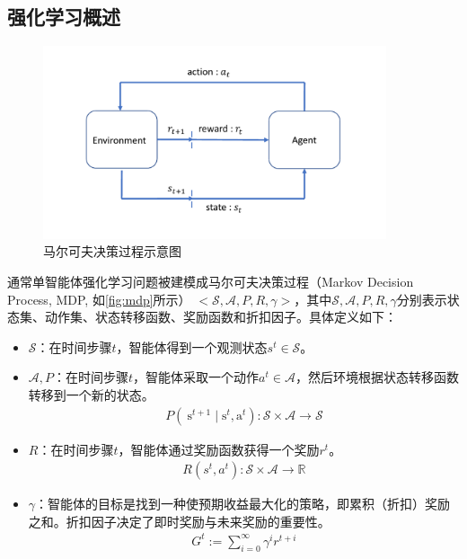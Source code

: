 \subsection{强化学习概述}
\begin{figure}[htb]
    \includegraphics[width=0.9\textwidth]{fig/rl.pdf}
    \caption{马尔可夫决策过程示意图}
    \label{fig:mdp}
\end{figure}
通常单智能体强化学习问题被建模成马尔可夫决策过程（Markov Decision Process, MDP, 如\autoref{fig:mdp}所示） $<\mathcal{S}, \mathcal{A}, P, R, \gamma>$，其中$\mathcal{S}, \mathcal{A}, P, R, \gamma$分别表示状态集、动作集、状态转移函数、奖励函数和折扣因子。具体定义如下：
\begin{itemize}
    \item $\mathcal{S}$：在时间步骤$t$，智能体得到一个观测状态$s^t \in \mathcal{S}$。
    \item $\mathcal{A}, P$：在时间步骤$t$，智能体采取一个动作$a^t \in \mathcal{A}$，然后环境根据状态转移函数转移到一个新的状态。
    \begin{align}
        P\left(\mathrm{~s}^{t+1} \mid \mathrm{s}^{t}, \mathrm{a}^{t}\right): \mathcal{S} \times \mathcal{A} \rightarrow \mathcal{S}
    \end{align}
    \item $R$：在时间步骤$t$，智能体通过奖励函数获得一个奖励$r^t$。
    \begin{align}
        R\left(s^{t}, a^{t}\right): \mathcal{S} \times \mathcal{A} \rightarrow \mathbb{R}
    \end{align}
    \item $\gamma$：智能体的目标是找到一种使预期收益最大化的策略，即累积（折扣）奖励之和。折扣因子决定了即时奖励与未来奖励的重要性。
    \begin{align}
        G^{t}:=\sum_{i=0}^{\infty} \gamma^{i} r^{t+i}
    \end{align}
  \end{itemize}
